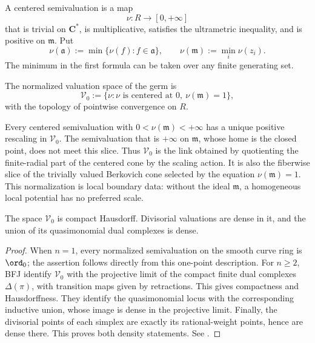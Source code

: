 A centered semivaluation is a map
\[
 \nu:R\longrightarrow[0,+\infty]
\tag{70.2}\label{eq:local-semivaluation-map}
\]
that is trivial on $\mathbf C^*$, is multiplicative, satisfies the
ultrametric inequality, and is positive on $\mathfrak m$.  Put
\[
 \nu(\mathfrak a):=\min\{\nu(f):f\in\mathfrak a\},
 \qquad
 \nu(\mathfrak m):=\min_i\nu(z_i).
\tag{70.3}\label{eq:local-ideal-value}
\]
The minimum in the first formula can be taken over any finite generating
set.

\begin{definition}
\label{def:local-normalized-space}
The normalized valuation space of the germ is
\[
 \mathcal V_0
 :=\{\nu:\nu\text{ is centered at }0,\ \nu(\mathfrak m)=1\},
\tag{70.4}\label{eq:local-normalized-space}
\]
with the topology of pointwise convergence on $R$.
\end{definition}

Every centered semivaluation with
$0<\nu(\mathfrak m)<+\infty$ has a unique positive rescaling in
$\mathcal V_0$.  The semivaluation that is $+\infty$ on
$\mathfrak m$, whose home is the closed point, does not meet this slice.
Thus $\mathcal V_0$ is the link obtained by quotienting the finite-radial
part of the centered cone by the scaling action.  It is
also the fiberwise slice of the trivially valued Berkovich cone selected by
the equation $\nu(\mathfrak m)=1$.  This normalization is local boundary
data: without the ideal $\mathfrak m$, a homogeneous local potential has no
preferred scale.

\begin{theorem}\label{thm:local-valuation-compactness}
The space $\mathcal V_0$ is compact Hausdorff.  Divisorial valuations are
dense in it, and the union of its quasimonomial dual complexes is dense.
\end{theorem}

\begin{proof}
When $n=1$, every normalized semivaluation on the smooth curve ring is
$\ord_0$; the assertion follows directly from this one-point description.
For $n\geq2$,
BFJ identify $\mathcal V_0$ with the projective limit of the compact finite
dual complexes $\Delta(\pi)$, with transition maps given by retractions.
This gives compactness and Hausdorffness.  They identify the quasimonomial
locus with the corresponding inductive union, whose image is dense in the
projective limit.  Finally, the divisorial points of each simplex are exactly
its rational-weight points, hence are dense there.  This proves both density
statements.  See \cite[Sections~1.3--1.7, especially
Theorem~1.13]{BFJ08}.
\end{proof}

